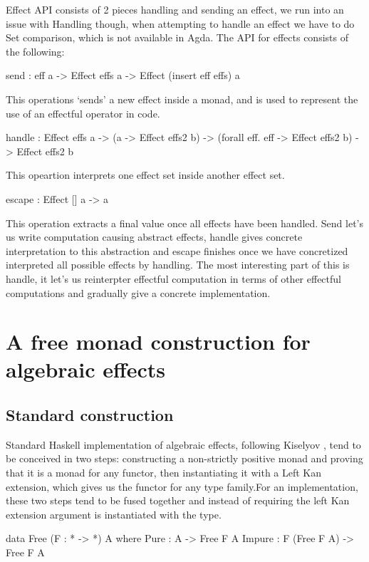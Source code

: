 \documentclass[10pt]{article}
\theoremstyle{definition}
\theoremstyle{remark}
\begin{document}
Effect API consists of 2 pieces handling and sending an effect, we run
into an issue with Handling though, when attempting to handle an
effect we have to do Set comparison, which is not available in Agda.
The API for effects consists of the following:
%
\begin{haskell}
send : eff a -> Effect effs a -> Effect (insert eff effs) a
\end{haskell}
%
This operations `sends' a new effect inside a monad, and is used
to represent the use of an effectful operator in code.
%
\begin{haskell}
handle : Effect effs a -> (a -> Effect effs2 b) -> (forall eff. eff ->
Effect effs2 b) -> Effect effs2 b
\end{haskell}
%
This opeartion interprets one effect set inside another effect set.
%
\begin{haskell}
escape : Effect [] a -> a
\end{haskell}
%
This operation extracts a final value once all effects have been handled.
Send let's us write computation causing abstract effects,
handle gives concrete interpretation to this abstraction and escape finishes once we have
concretized interpreted all possible effects by handling.
The most interesting part of this is handle, it let's us reinterpter
effectful computation in terms of other effectful computations and gradually give a concrete implementation.

\section{A free monad construction for algebraic effects}
\label{sec:effect-monad}

\subsection{Standard construction}

Standard Haskell implementation of algebraic effects,  following Kiselyov \cite{Kiselyov},
tend to be conceived in two steps: constructing a non-strictly positive
 monad and proving that it is a monad for any functor,
then instantiating it with a Left Kan extension, which gives us the functor for any type family.For an implementation, these two steps
tend to be fused together and instead of requiring the left Kan
extension argument is instantiated with the type.

\begin{haskell}
	data Free (F : * -> *) A where
		Pure : A -> Free F A
		Impure : F (Free F A) -> Free F A
\end{haskell}
%
\end{document}
